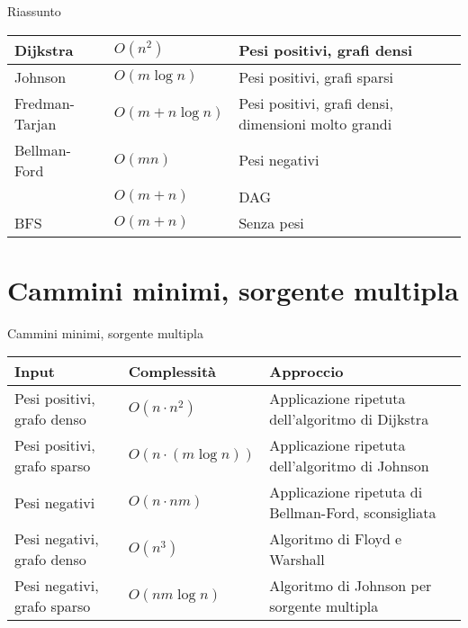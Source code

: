 \begin{frame}{Riassunto}

\vspace{-9pt}

\medskip
\begingroup
\renewcommand*{\arraystretch}{1.2}
\begin{tabular}{|l|l|P{5cm}|}
\hline
Dijkstra & $O(n^2)$ & Pesi positivi, grafi densi \\\hline
Johnson & $O(m \log n)$ & Pesi positivi, grafi sparsi \\\hline
Fredman-Tarjan & $O(m + n \log n)$ & Pesi positivi, grafi densi, dimensioni molto grandi  \\\hline
Bellman-Ford & $O(mn)$ & Pesi negativi \\\hline
  & $O(m+n)$ & DAG \\\hline
BFS & $O(m+n)$ & Senza pesi \\\hline
\end{tabular}
\endgroup

\end{frame}


\section{Cammini minimi, sorgente multipla}

\vspace{-9pt}
\begin{frame}{Cammini minimi, sorgente multipla}

\vspace{-9pt}

\medskip
\begingroup
\renewcommand*{\arraystretch}{1.2}
\small
\begin{tabular}{|P{2.3cm}|P{2.6cm}|P{5.8cm}|}
\hline
\textbf{Input} & \textbf{Complessità} & \textbf{Approccio} \\\hline
Pesi positivi, grafo denso & $O(n \cdot n^2)$ & Applicazione ripetuta dell'algoritmo di Dijkstra \\\hline
Pesi positivi, grafo sparso & $O(n \cdot (m \log n))$ & Applicazione ripetuta dell'algoritmo di Johnson \\\hline
Pesi negativi & $O(n \cdot nm)$ & Applicazione ripetuta di Bellman-Ford, \alert{sconsigliata} \\\hline
Pesi negativi, grafo denso & $O(n^3)$ & Algoritmo di \alert{Floyd e Warshall} \\\hline
Pesi negativi, grafo sparso & $O(nm \log n)$ & Algoritmo di \alert{Johnson per sorgente multipla} \\\hline
\end{tabular}
\endgroup

\end{frame}

